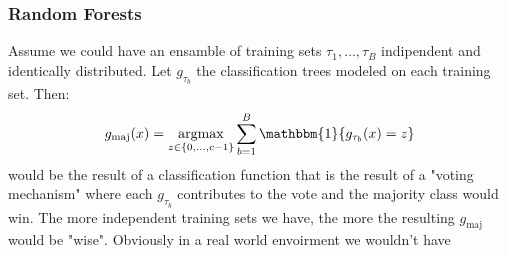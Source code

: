 \subsubsection*{Random Forests}
Assume we could have an ensamble of training sets \(\tau_1, \dots , \tau_B\) indipendent and identically distributed. Let \(g_{\tau_b}\) the classification trees modeled on each training set. Then:
\begin{equation}
    g_{\text{maj}}(x) = \argmax_{z \in \{0, \dots, c-1\}}  \sum \limits_{b= 1}^{B} \mathbbm{1}\{g_{\tau_b}(x) = z\}
\end{equation} 
would be the result of a classification function that is the result of a "voting mechanism" where each \(g_{\tau_b}\) contributes to the vote and the majority class would win. The more independent training sets we have, the more the resulting \(g_{\text{maj}}\) would be "wise". Obviously in a real world envoirment we wouldn't have 
